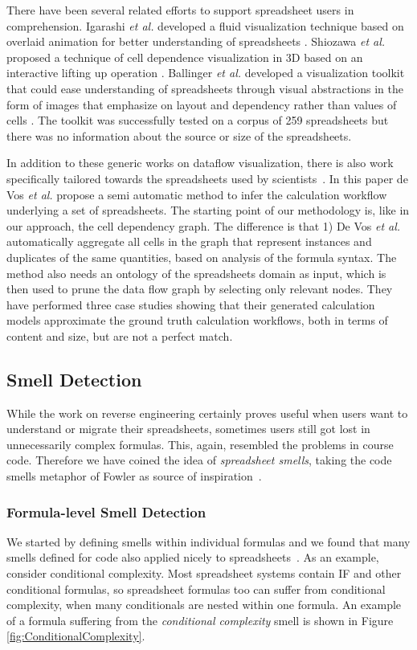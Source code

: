 \documentclass[conference]{IEEEtran}
\begin{document}
There have been several related efforts to support spreadsheet users in comprehension. Igarashi \emph{et al.} developed a fluid visualization technique based on overlaid animation for better understanding of spreadsheets \cite{igarashi1998fluid}. Shiozawa \textit{et al.} proposed a technique of cell dependence visualization in 3D based on an interactive lifting up operation \cite{shiozawa19993d}. Ballinger \textit{et al.} developed a visualization toolkit that could ease understanding of spreadsheets through visual abstractions in the form of images that emphasize on layout and dependency rather than values of cells \cite{ballinger2003spreadsheet}. The toolkit was successfully tested on a corpus of 259 spreadsheets but there was no information about the source or size of the spreadsheets. 

In addition to these generic works on dataflow visualization, there is also work specifically tailored towards the spreadsheets used by scientists~\cite{de_vos_methodology_2015}. In this paper de Vos \emph{et al.} propose a semi automatic method to infer the calculation workflow underlying a set of spreadsheets. The starting point of our methodology is, like in our approach, the cell dependency graph. The difference is that 1) De Vos \emph{et al.} automatically aggregate all cells in the graph that represent instances and duplicates of the same quantities, based on analysis of the formula syntax. The method also needs an ontology of the spreadsheets domain as input, which is then used to prune the data flow graph by selecting only relevant nodes. They have performed three case studies showing that their generated calculation models approximate the ground truth calculation workflows, both in terms of content and size, but are not a perfect match.

\subsection{Smell Detection} 
While the work on reverse engineering certainly proves useful when users want to understand or migrate their spreadsheets, sometimes users still got lost in unnecessarily complex formulas. This, again, resembled the problems in course code. Therefore we have coined the idea of \emph{spreadsheet smells}, taking the code smells metaphor of Fowler as source of inspiration~\cite{Fowl1999}.

\subsubsection{Formula-level Smell Detection}
We started by defining smells within individual formulas and we found that many smells defined for code also applied nicely to spreadsheets~\cite{hermans_detecting_2014}. As an example, consider conditional complexity. Most spreadsheet systems contain IF and other conditional formulas, so spreadsheet formulas too can suffer from conditional complexity, when many conditionals are nested within one formula. An example of a formula suffering from the \emph{conditional complexity} smell is shown in Figure \ref{fig:ConditionalComplexity}.
\end{document}
